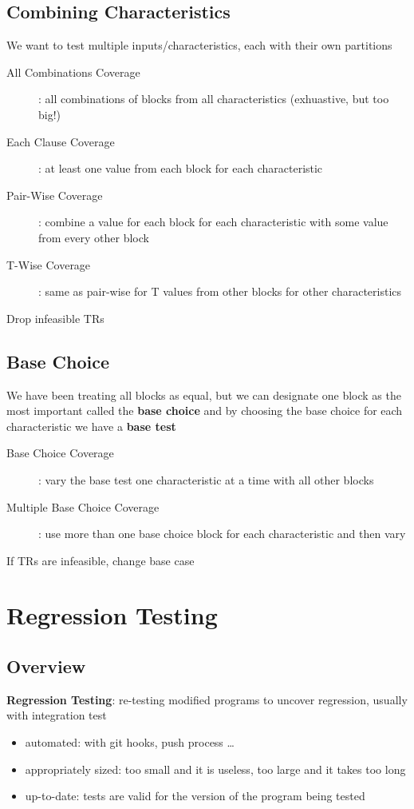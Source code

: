 \documentclass[]{article}
\theoremstyle{definition}
\begin{document}
		\subsection{Combining Characteristics}
		We want to test multiple inputs/characteristics, each with their own partitions 
		
		\begin{description}
			\item[All Combinations Coverage]: all combinations of blocks from all characteristics (exhuastive, but too big!)
			\item[Each Clause Coverage]: at least one value from each block for each characteristic
			\item[Pair-Wise Coverage]: combine a value for each block for each characteristic with some value from every other block
			\item[T-Wise Coverage]: same as pair-wise for T values from other blocks for other characteristics
		\end{description}

		Drop infeasible TRs

		\subsection{Base Choice}
		We have been treating all blocks as equal, but we can designate one block as the most important called the \textbf{base choice}
		and by choosing the base choice for each characteristic we have a \textbf{base test}

	\begin{description}
		\item[Base Choice Coverage]: vary the base test one characteristic at a time with all other blocks
		\item[Multiple Base Choice Coverage]: use more than one base choice block for each characteristic and then vary
	\end{description}

	If TRs are infeasible, change base case

		


	

	\section{Regression Testing}
	\subsection{Overview}
	\textbf{Regression Testing}: re-testing modified programs to uncover regression, usually with integration test
	\begin{itemize}
		\item automated: with git hooks, push process \dots
		\item appropriately sized: too small and it is useless, too large and it takes too long
		\item up-to-date: tests are valid for the version of the program being tested
	\end{itemize}
\end{document}
